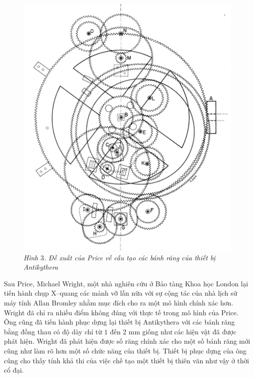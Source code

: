 \begin{multicols}{2}
\begin{figure}[H]
		\includegraphics[width= 0.85\linewidth]{4}
		\caption{\small\textit{\color{lichsutoanhoc}Hình $3$. Đề xuất của Price về cấu tạo các bánh răng của thiết bị Antikythera}}
		\vspace*{-10pt}
	\end{figure}
	Sau Price, Michael Wright, một nhà nghiên cứu ở Bảo tàng Khoa học London lại tiến hành chụp X--quang các mảnh vỡ lần nữa với sự cộng tác của nhà lịch sử máy tính Allan Bromley nhằm mục đích cho ra một mô hình chính xác hơn. Wright đã chỉ ra nhiều điểm không đúng với thực tế trong mô hình của Price. Ông cũng đã tiến hành phục dựng lại thiết bị Antikythera với các bánh răng bằng đồng thau có độ dày chỉ từ $1$ đến $2$ mm giống như các hiện vật đã được phát hiện. Wright đã phát hiện được số răng chính xác cho một số bánh răng mới cũng như làm rõ hơn một số chức năng của thiết bị. Thiết bị phục dựng của ông cũng cho thấy tính khả thi của việc chế tạo một thiết bị thiên văn như vậy ở thời cổ đại.
	\begin{figure}[H]
		\vspace*{-5pt}
		\centering
		\captionsetup{labelformat= empty, justification=centering}

\end{figure}
\end{multicols}
